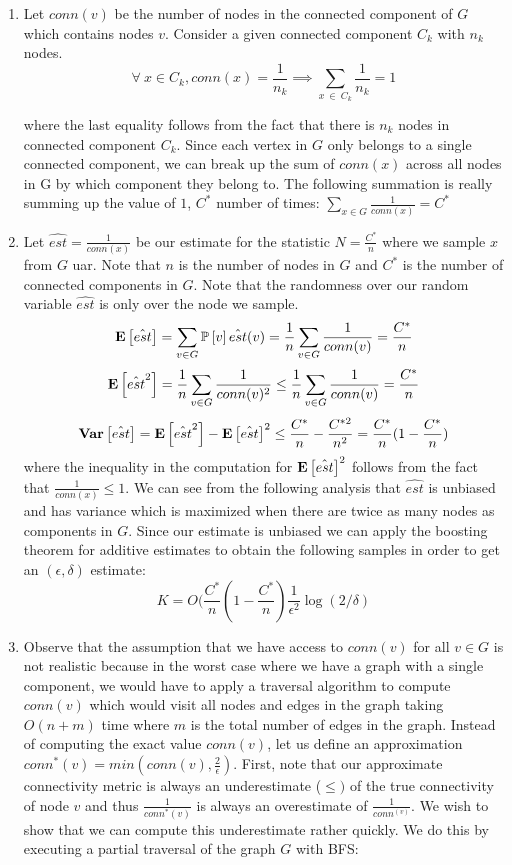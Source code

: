 \documentclass[12pt]{article}
\begin{document}
\begin{solution}
\begin{enumerate}[label=(\alph*)]
    \item Let $conn(v)$ be the number of nodes in the connected component of $G$ which contains nodes $v$. Consider a given connected component $C_k$ with $n_k$ nodes. 
\[
    \forall~x\in C_k, conn(x)=\frac{1}{n_k} \implies \sum_{x~\in~C_k}{\frac{1}{n_k}} = 1
\]
    
    where the last equality follows from the fact that there is $n_k$ nodes in connected component $C_k$. Since each vertex in $G$ only belongs to a single connected component, we can break up the sum of $conn(x)$ across all nodes in G by which component they belong to. The following summation is really summing up the value of $1$, $C^*$ number of times: $\sum_{x\in G}{\frac{1}{conn(x)}} = C^*$
    \item Let $\hat{est} = \frac{1}{conn(x)}$ be our estimate for the statistic $N = \frac{C^*}{n}$ where we sample $x$ from $G$ 
    uar. Note that $n$ is the number of nodes in $G$ and $C^*$ is the number of connected components in $G$. Note that the randomness over our random variable $\hat{est}$ is only over the node we sample. 
    \[
    \mathbf{E}\left[\hat{est}\right] = \sum_{v\in G}{\mathbb{P}\left[v\right]\hat{est}(v)} =  \frac{1}{n}\sum_{v\in G}{\frac{1}{conn(v)}} = \frac{C^*}{n}
    \]
    \[
    \mathbf{E}\left[\hat{est}^2\right] = \frac{1}{n}\sum_{v\in G}{\frac{1}{conn(v)^2}} \leq \frac{1}{n}\sum_{v\in G}{\frac{1}{conn(v)}} = \frac{C^*}{n}
    \]
    \[
    \mathbf{Var}\left[\hat{est}\right] = \mathbf{E}\left[\hat{est}^2\right] - \mathbf{E}\left[\hat{est}\right]^2 \leq \frac{C^*}{n} - \frac{C^{*2}}{n^2} = \frac{C^*}{n} (1 - \frac{C^*}{n})
    \]
    where the inequality in the computation for $\mathbf{E}\left[\hat{est}\right]^2$ follows from the fact that $\frac{1}{conn(x)} \leq 1$. We can see from the following analysis that $\hat{est}$ is unbiased and has variance which is maximized when there are twice as many nodes as components in $G$. Since our estimate is unbiased we can apply the boosting theorem for additive estimates to obtain the following samples in order to get an $(\epsilon,\delta)$ estimate:
    \[
    K = O(\frac{C^*}{n} (1 - \frac{C^*}{n}) \frac{1}{\epsilon^2} \log(2/\delta)
    \]
    \item Observe that the assumption that we have access to $conn(v)$ for all $v\in G$ is not realistic because in the worst case where we have a graph with a single component, we would have to apply a traversal algorithm to compute $conn(v)$ which would visit all nodes and edges in the graph taking $O(n + m)$ time where $m$ is the total number of edges in the graph. Instead of computing the exact value $conn(v)$, let us define an approximation $conn^*(v) = min(conn(v), \frac{2}{\epsilon})$. First, note that our approximate connectivity metric is always an underestimate ($\leq)$ of the true connectivity of node $v$ and thus $\frac{1}{conn^*(v)}$ is always an overestimate of $\frac{1}{conn^(v)}$. We wish to show that we can compute this underestimate rather quickly. We do this by executing a partial traversal of the graph $G$ with BFS:


\end{enumerate}
\end{solution}
\end{document}
